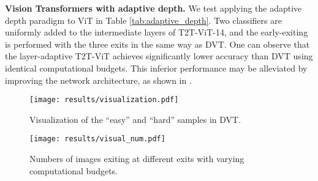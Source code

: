 \documentclass{article}
\begin{document}
\begin{wraptable}{r}{0.64\columnwidth}
    \centering
    \vskip -0.15in
    \begin{footnotesize}
    \vskip -0.075in 
    \label{tab:adaptive_depth}
    \end{footnotesize}
    \vskip -0.2in
\end{wraptable}
\textbf{Vision Transformers with adaptive depth.} 
We test applying the adaptive depth paradigm \cite{huang2017multi, yang2020resolution} to ViT in Table \ref{tab:adaptive_depth}. Two classifiers are uniformly added to the intermediate layers of T2T-ViT-14, and the early-exiting is performed with the three exits in the same way as DVT. One can observe that the layer-adaptive T2T-ViT achieves significantly lower accuracy than DVT using identical computational budgets. This inferior performance may be alleviated by improving the network architecture, as shown in \cite{huang2017multi}. 





\begin{figure*}[t]
    \begin{center}
    \begin{minipage}{0.64\columnwidth}
\texttt{[image: results/visualization.pdf]}	
        \vskip -0.075in
        \caption{Visualization of the ``easy'' and ``hard'' samples in DVT.
    }\label{fig:vis_sample}
\end{minipage}
    \hspace{0.01in}
    \begin{minipage}{0.345\columnwidth}
\hspace{-0.05in}
        \texttt{[image: results/visual\_num.pdf]}
        \vskip -0.125in
\caption{Numbers of images exiting at different exits with varying computational budgets.
    }\label{fig:vis_num}
    \end{minipage}
    \end{center}
    \vskip -0.25in
 \end{figure*}
\end{document}
